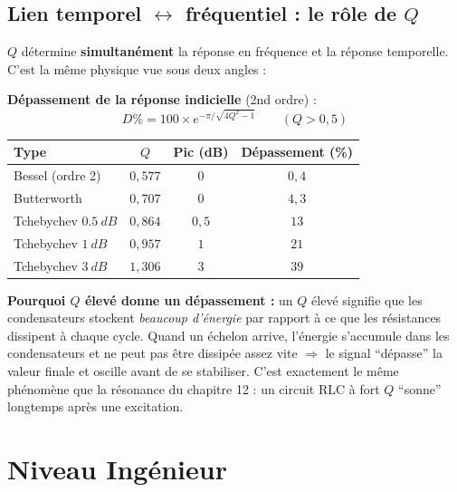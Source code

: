 \documentclass[12pt,a4paper,twoside]{book}
\begin{document}
\subsection{Lien temporel $\leftrightarrow$ fréquentiel : le rôle de $Q$}

$Q$ détermine \textbf{simultanément} la réponse en fréquence et la réponse temporelle. C'est la même physique vue sous deux angles :

\begin{formule}
\textbf{Dépassement de la réponse indicielle} (2nd ordre) :
\[
\boxed{D\% = 100 \times e^{-\pi/\sqrt{4Q^2 - 1}}} \qquad (Q > 0{,}5)
\]

\begin{center}
\renewcommand{\arraystretch}{1.4}
\begin{tabular}{lccc}
\toprule
\textbf{Type} & \textbf{$Q$} & \textbf{Pic (dB)} & \textbf{Dépassement (\%)} \\
\midrule
Bessel (ordre 2) & $0{,}577$ & $0$ & $0{,}4$ \\
Butterworth & $0{,}707$ & $0$ & $4{,}3$ \\
Tchebychev $\SI{0.5}{dB}$ & $0{,}864$ & $0{,}5$ & $13$ \\
Tchebychev $\SI{1}{dB}$ & $0{,}957$ & $1$ & $21$ \\
Tchebychev $\SI{3}{dB}$ & $1{,}306$ & $3$ & $39$ \\
\bottomrule
\end{tabular}
\end{center}
\end{formule}

\begin{intuition}
\textbf{Pourquoi $Q$ élevé donne un dépassement :} un $Q$ élevé signifie que les condensateurs stockent \textit{beaucoup d'énergie} par rapport à ce que les résistances dissipent à chaque cycle. Quand un échelon arrive, l'énergie s'accumule dans les condensateurs et ne peut pas être dissipée assez vite $\Rightarrow$ le signal ``dépasse'' la valeur finale et oscille avant de se stabiliser. C'est exactement le même phénomène que la résonance du chapitre 12 : un circuit RLC à fort $Q$ ``sonne'' longtemps après une excitation.
\end{intuition}

\section{Niveau Ingénieur}
\end{document}
